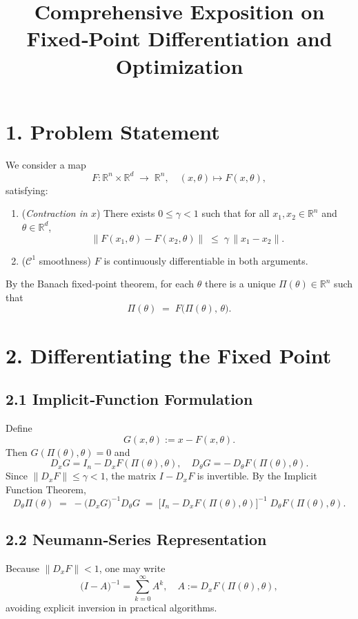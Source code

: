 \documentclass{article}
\begin{document}
\title{Comprehensive Exposition on Fixed‐Point Differentiation and Optimization}
\author{}
\date{}
\maketitle

\section*{1. Problem Statement}
We consider a map
\[
  F\colon \mathbb{R}^n \times \mathbb{R}^d \;\longrightarrow\; \mathbb{R}^n,
  \quad (x,\theta)\mapsto F(x,\theta),
\]
satisfying:
\begin{enumerate}
  \item[(i)] (\emph{Contraction in \(x\)})\quad
    There exists \(0\le\gamma<1\) such that for all \(x_1,x_2\in\mathbb{R}^n\) and \(\theta\in\mathbb{R}^d\),
    \[
      \|F(x_1,\theta)-F(x_2,\theta)\|\;\le\;\gamma\,\|x_1-x_2\|.
    \]
  \item[(ii)] (\(\mathcal C^1\) smoothness)\quad
    \(F\) is continuously differentiable in both arguments.
\end{enumerate}
By the Banach fixed‐point theorem, for each \(\theta\) there is a unique
\(\Pi(\theta)\in\mathbb{R}^n\) such that
\[
  \Pi(\theta) \;=\; F\bigl(\Pi(\theta),\,\theta\bigr).
\]

\section*{2. Differentiating the Fixed Point}
\subsection*{2.1 Implicit‐Function Formulation}
Define 
\[
  G(x,\theta) := x - F(x,\theta).
\]
Then \(G(\Pi(\theta),\theta)=0\) and
\[
  D_xG = I_n - D_xF(\Pi(\theta),\theta), 
  \quad
  D_\theta G = -\,D_\theta F(\Pi(\theta),\theta).
\]
Since \(\|D_xF\|\le\gamma<1\), the matrix \(I - D_xF\) is invertible.  By the Implicit Function Theorem,
\[
  D_\theta\Pi(\theta)
  \;=\;
  -\bigl(D_xG\bigr)^{-1}D_\theta G
  \;=\;
  \bigl[I_n - D_xF(\Pi(\theta),\theta)\bigr]^{-1}
  \;D_\theta F(\Pi(\theta),\theta).
\]

\subsection*{2.2 Neumann‐Series Representation}
Because \(\|D_xF\|<1\), one may write
\[
  \bigl(I - A\bigr)^{-1}
  = \sum_{k=0}^\infty A^k,
  \quad A := D_xF(\Pi(\theta),\theta),
\]
avoiding explicit inversion in practical algorithms.
\end{document}
